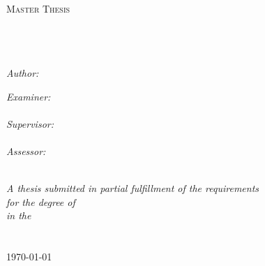 \documentclass[11pt, oneside, dvipsnames]{Thesis} %
\begin{document}
\begingroup
\hypersetup{
	urlcolor=black
}
\begin{titlepage}
	\begin{center}

		\textsc{\LARGE \univname}\\[1.5cm] %
		\textsc{\Large Master Thesis}\\[0.5cm] %

		\HRule \\[0.4cm] %
		{\huge \bfseries \ttitle}\\[0.4cm] %
		\HRule \\[1.5cm] %

		\begin{minipage}{0.4\textwidth}
			\begin{flushleft} \large
				\emph{Author:}\\
				\href{http://amirsahrani.com}{\authornames} %
			\end{flushleft}
		\end{minipage}
		\begin{minipage}{0.4\textwidth}
			\begin{flushright} \large
				\emph{Examiner:} \\
				{\exname}\\
				\emph{Supervisor:} \\
				{\supname}\\
				\emph{Assessor:} \\
				{\assessorname}
			\end{flushright}
		\end{minipage}\\[1cm]

		\large \textit{A thesis submitted in partial fulfillment of the requirements\\ for the degree of \degreename}\\[0.3cm] %
		\textit{in the}\\[0.4cm]
		\groupname\\\deptname\\[2cm] %

		{\large \today}\\[2cm] %

		\vfill
	\end{center}

\end{titlepage}
\endgroup
\end{document}
